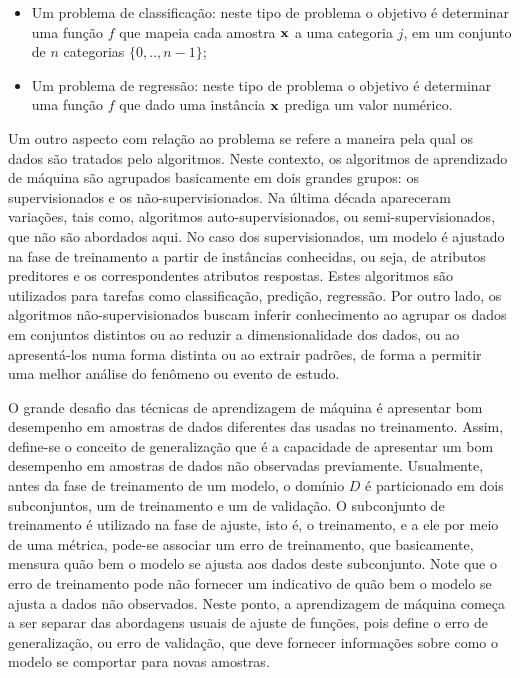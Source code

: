 \begin{itemize}
\item Um problema de classificação: neste tipo de problema o objetivo é determinar uma função $f$ que mapeia cada amostra $\bf x$ a uma categoria $j$, em um conjunto de $n$ categorias $\{0,..,n-1\}$;
\item Um problema de regressão: neste tipo de problema o objetivo é determinar uma função $f$ que dado uma instância $\bf x$ prediga um valor numérico.
\end{itemize}

Um outro aspecto com relação ao problema se refere a maneira pela qual os dados são tratados pelo algoritmos. Neste contexto, os algoritmos de aprendizado de máquina são agrupados basicamente em dois grandes grupos: os supervisionados e os não-supervisionados. Na última década apareceram variações, tais como, algoritmos auto-supervisionados, ou semi-supervisionados, que não são abordados aqui. No caso dos supervisionados, um modelo é ajustado na fase de treinamento a partir de instâncias conhecidas, ou seja, de atributos preditores e os correspondentes atributos respostas. Estes algoritmos são utilizados para tarefas como classificação, predição, regressão. Por outro lado, os algoritmos não-supervisionados buscam inferir conhecimento ao agrupar os dados em conjuntos distintos ou ao reduzir a dimensionalidade dos dados, ou ao apresentá-los numa forma distinta ou ao extrair padrões, de forma a permitir uma melhor análise do fenômeno ou evento de estudo.

O grande desafio das técnicas de aprendizagem de máquina é apresentar bom desempenho em amostras de dados diferentes das usadas no treinamento. Assim, define-se o conceito de generalização que é a capacidade de apresentar um bom desempenho em amostras de dados não observadas previamente. Usualmente, antes da fase de treinamento de um modelo, o domínio $D$ é particionado em dois subconjuntos, um de treinamento e um de validação. O subconjunto de treinamento é utilizado na fase de ajuste, isto é, o treinamento, e a ele por meio de uma métrica, pode-se associar um erro de treinamento, que basicamente, mensura quão bem o modelo se ajusta aos dados deste subconjunto. Note que o erro de treinamento pode não fornecer um indicativo de quão bem o modelo se ajusta a dados não observados. Neste ponto, a aprendizagem de máquina começa a ser separar das abordagens usuais de ajuste de funções, pois define o erro de generalização, ou erro de validação, que deve fornecer informações sobre como o modelo se comportar para novas amostras.

